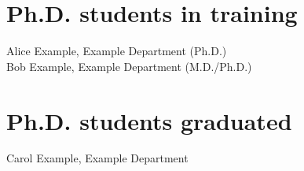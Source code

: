 \section{\sc Ph.D. students in training}
Alice Example, Example Department (Ph.D.)\\
Bob Example, Example Department (M.D./Ph.D.)\\

\section{\sc Ph.D. students graduated}

Carol Example, Example Department\\

